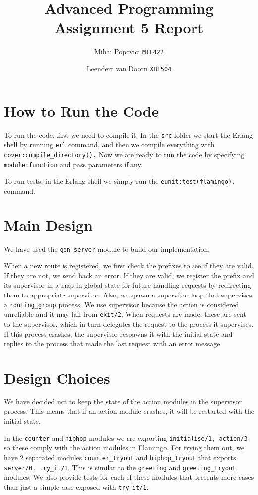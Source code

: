 \documentclass{article}
\title{Advanced Programming Assignment 5 Report}
\author{Mihai Popovici \texttt{MTF422} \and Leendert van Doorn \texttt{XBT504}}
\begin{document}
	
	\maketitle	
	
	\section{How to Run the Code}
	To run the code, first we need to compile it. In the \texttt{src} folder we start the Erlang shell by running \texttt{erl} command, and then we compile everything with \texttt{cover:compile\_directory().}
	Now we are ready to run the code by specifying \texttt{module:function} and pass parameters if any.
	
	To run tests, in the Erlang shell we simply run the \texttt{eunit:test(flamingo).} command.
	
	\section{Main Design}
	We have used the \texttt{gen\_server} module to build our implementation. 
	
	When a new route is registered, we first check the prefixes to see if they are valid. If they are not, we send back an error. If they are valid, we register the prefix and its supervisor in a map in global state for future handling requests by redirecting them to appropriate supervisor. Also, we spawn a supervisor loop that supervises a \texttt{routing\_group} process. We use supervisor because the action is considered unreliable and it may fail from \texttt{exit/2}. When requests are made, these are sent to the supervisor, which in turn delegates the request to the process it supervises. If this process crashes, the supervisor respawns it with the initial state and replies to the process that made the last request with an error message.
	
	\section{Design Choices}
	We have decided not to keep the state of the action modules in the supervisor process. This means that if an action module crashes, it will be restarted with the initial state.
	
	In the \texttt{counter} and \texttt{hiphop} modules we are exporting \texttt{initialise/1, action/3} so these comply with the action modules in Flamingo. For trying them out, we have 2 separated modules \texttt{counter\_tryout} and \texttt{hiphop\_tryout} that exports \texttt{server/0, try\_it/1}. This is similar to the \texttt{greeting} and \texttt{greeting\_tryout} modules. We also provide tests for each of these modules that presents more cases than just a simple case exposed with \texttt{try\_it/1}.
	
\end{document}
